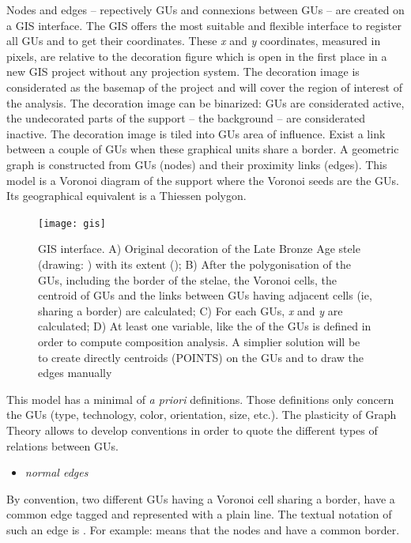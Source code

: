 \documentclass[article]{jss}\usepackage[]{graphicx}\usepackage[]{color}
\begin{document}
Nodes and edges -- repectively GUs and connexions between GUs -- are created on a GIS interface. The GIS offers the most suitable and flexible interface to register all GUs and to get their coordinates. These \emph{x} and \emph{y} coordinates, measured in pixels, are relative to the decoration figure which is open in the first place in a new GIS project without any projection system. The decoration image is considerated as the basemap of the project and will cover the region of interest of the analysis. The decoration image can be binarized: GUs are considerated active, the undecorated parts of the support -- the background -- are considerated inactive. The decoration image is tiled into GUs area of influence.
Exist a link between a couple of GUs when these graphical units share a border. A geometric graph is constructed from GUs (nodes) and their proximity links (edges). This model is a Voronoi diagram of the support where the Voronoi seeds are the GUs. Its geographical equivalent is a Thiessen polygon.


\begin{figure}[H]
\centering
\texttt{[image: gis]}
\caption{\label{fig:gis} GIS interface. A) Original decoration of the Late Bronze Age  stele (drawing: \cite{DiazGuardamino10}) with its extent (); B) After the polygonisation of the GUs, including the border of the stelae, the Voronoi cells, the centroid of GUs and the links between GUs having adjacent cells (ie, sharing a border) are calculated; C) For each GUs, \emph{x} and \emph{y} are calculated; D) At least one variable, like the  of the GUs is defined in order to compute composition analysis. A simplier solution will be to create directly centroids (POINTS) on the GUs and to draw the edges manually}
\end{figure}

This model has a minimal of \emph{a priori} definitions. Those definitions only concern the GUs (type, technology, color, orientation, size, etc.). The plasticity of Graph Theory allows to develop conventions in order to quote the different types of relations between GUs.

\begin{itemize}
  \item \emph{normal edges}
\end{itemize}

By convention, two different GUs having a Voronoi cell sharing a border, have a common edge tagged  and represented with a plain line. The textual notation of such an edge is . For example:  means that the nodes  and  have a common border.
\end{document}

